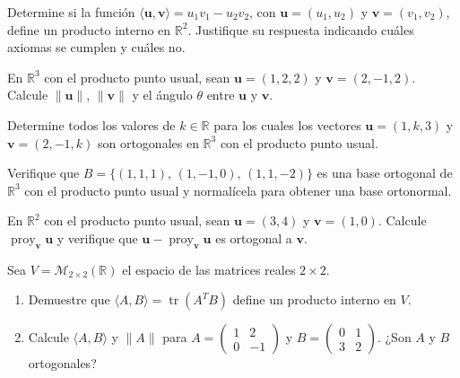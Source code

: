 \begin{prob}
Determine si la función $\langle \mathbf{u}, \mathbf{v} \rangle = u_1v_1 - u_2v_2$, con $\mathbf{u}=(u_1,u_2)$ y $\mathbf{v}=(v_1,v_2)$, define un producto interno en $\mathbb{R}^2$. Justifique su respuesta indicando cuáles axiomas se cumplen y cuáles no.
\end{prob}

\begin{prob}
En $\mathbb{R}^3$ con el producto punto usual, sean $\mathbf{u}=(1,2,2)$ y $\mathbf{v}=(2,-1,2)$. Calcule $\|\mathbf{u}\|$, $\|\mathbf{v}\|$ y el ángulo $\theta$ entre $\mathbf{u}$ y $\mathbf{v}$.
\end{prob}

\begin{prob}
Determine todos los valores de $k \in \mathbb{R}$ para los cuales los vectores $\mathbf{u}=(1,k,3)$ y $\mathbf{v}=(2,-1,k)$ son ortogonales en $\mathbb{R}^3$ con el producto punto usual.
\end{prob}

\begin{prob}
Verifique que $B=\{(1,1,1),\, (1,-1,0),\, (1,1,-2)\}$ es una base ortogonal de $\mathbb{R}^3$ con el producto punto usual y normalícela para obtener una base ortonormal.
\end{prob}

\begin{prob}
En $\mathbb{R}^2$ con el producto punto usual, sean $\mathbf{u}=(3,4)$ y $\mathbf{v}=(1,0)$. Calcule $\operatorname{proy}_{\mathbf{v}}\mathbf{u}$ y verifique que $\mathbf{u} - \operatorname{proy}_{\mathbf{v}}\mathbf{u}$ es ortogonal a $\mathbf{v}$.
\end{prob}

\begin{prob}
Sea $V=\mathcal{M}_{2\times 2}(\mathbb{R})$ el espacio de las matrices reales $2\times 2$.
\begin{enumerate}[$a)$]
\item Demuestre que $\langle A, B \rangle = \operatorname{tr}(A^TB)$ define un producto interno en $V$.
\item Calcule $\langle A, B \rangle$ y $\|A\|$ para $A=\begin{pmatrix} 1 & 2 \\ 0 & -1 \end{pmatrix}$ y $B=\begin{pmatrix} 0 & 1 \\ 3 & 2 \end{pmatrix}$. ¿Son $A$ y $B$ ortogonales?
\end{enumerate}
\end{prob}

